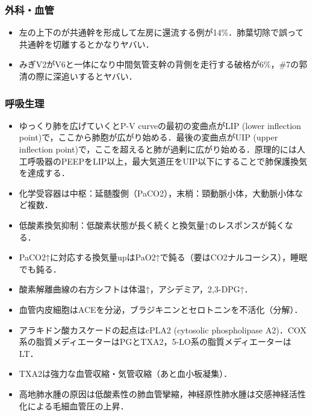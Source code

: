 \begin{itemize}

\end{itemize}


\subsubsection{外科・血管}

\begin{itemize}
\item 左の上下のが共通幹を形成して左房に還流する例が14\%．肺葉切除で誤って共通幹を切離するとかなりヤバい．
\item みぎV2がV6と一体になり中間気管支幹の背側を走行する破格が6\%，\#7の郭清の際に深追いするとヤバい．

\end{itemize}


\subsubsection{呼吸生理}

\begin{itemize}
\item ゆっくり肺を広げていくとP-V curveの最初の変曲点がLIP (lower inflection point)で，ここから肺胞が広がり始める．最後の変曲点がUIP (upper inflection point)で，ここを超えると肺が過剰に広がり始める．原理的には人工呼吸器のPEEPをLIP以上，最大気道圧をUIP以下にすることで肺保護換気を達成する．


\item 化学受容器は中枢：延髄腹側（PaCO2），末梢：頸動脈小体，大動脈小体など複数．
\item 低酸素換気抑制：低酸素状態が長く続くと換気量↑のレスポンスが鈍くなる．
\item PaCO2↑に対応する換気量upはPaO2↑で鈍る（要はCO2ナルコーシス），睡眠でも鈍る．
\item 酸素解離曲線の右方シフトは体温↑，アシデミア，2,3-DPG↑．
\item 血管内皮細胞はACEを分泌，ブラジキニンとセロトニンを不活化（分解）．
\item アラキドン酸カスケードの起点はcPLA2 (cytosolic phospholipase A2)．COX系の脂質メディエーターはPGとTXA2，5-LO系の脂質メディエーターはLT．
\item TXA2は強力な血管収縮・気管収縮（あと血小板凝集）．
\item 高地肺水腫の原因は低酸素性の肺血管攣縮，神経原性肺水腫は交感神経活性化による毛細血管圧の上昇．
\end{itemize}


